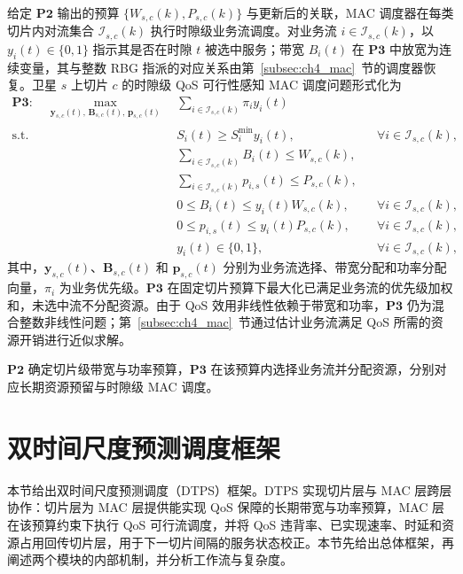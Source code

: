 给定 $\mathbf{P2}$ 输出的预算 $\{W_{s,c}(k),P_{s,c}(k)\}$ 与更新后的关联，MAC 调度器在每类切片内对流集合 $\mathcal I_{s,c}(k)$ 执行时隙级业务流调度。对业务流 $i\in\mathcal I_{s,c}(k)$，以 $y_i(t)\in\{0,1\}$ 指示其是否在时隙 $t$ 被选中服务；带宽 $B_i(t)$ 在 $\mathbf{P3}$ 中放宽为连续变量，其与整数 RBG 指派的对应关系由第~\ref{subsec:ch4_mac}~节的调度器恢复。卫星 $s$ 上切片 $c$ 的时隙级 QoS 可行性感知 MAC 调度问题形式化为
\begin{equation}\label{eq:ch4_P3}
\begin{aligned}
\mathbf{P3:}\quad \max_{\mathbf y_{s,c}(t),\,\mathbf B_{s,c}(t),\,\mathbf p_{s,c}(t)}\ &\sum_{i\in\mathcal I_{s,c}(k)}\pi_i y_i(t)\\
\text{s.t.}\quad &S_i(t)\ge S_i^{\min}y_i(t),&&\forall i\in\mathcal I_{s,c}(k),\\
&\sum_{i\in\mathcal I_{s,c}(k)}B_i(t)\le W_{s,c}(k),&&\\
&\sum_{i\in\mathcal I_{s,c}(k)}p_{i,s}(t)\le P_{s,c}(k),&&\\
&0\le B_i(t)\le y_i(t)W_{s,c}(k),&&\forall i\in\mathcal I_{s,c}(k),\\
&0\le p_{i,s}(t)\le y_i(t)P_{s,c}(k),&&\forall i\in\mathcal I_{s,c}(k),\\
&y_i(t)\in\{0,1\},&&\forall i\in\mathcal I_{s,c}(k),
\end{aligned}
\end{equation}
其中，$\mathbf y_{s,c}(t)$、$\mathbf B_{s,c}(t)$ 和 $\mathbf p_{s,c}(t)$ 分别为业务流选择、带宽分配和功率分配向量，$\pi_i$ 为业务优先级。$\mathbf{P3}$ 在固定切片预算下最大化已满足业务流的优先级加权和，未选中流不分配资源。由于 QoS 效用非线性依赖于带宽和功率，$\mathbf{P3}$ 仍为混合整数非线性问题；第~\ref{subsec:ch4_mac}~节通过估计业务流满足 QoS 所需的资源开销进行近似求解。

$\mathbf{P2}$ 确定切片级带宽与功率预算，$\mathbf{P3}$ 在该预算内选择业务流并分配资源，分别对应长期资源预留与时隙级 MAC 调度。

\section{双时间尺度预测调度框架}
\label{sec:ch4_dtps}

本节给出双时间尺度预测调度（DTPS）框架。DTPS 实现切片层与 MAC 层跨层协作：切片层为 MAC 层提供能实现 QoS 保障的长期带宽与功率预算，MAC 层在该预算约束下执行 QoS 可行流调度，并将 QoS 违背率、已实现速率、时延和资源占用回传切片层，用于下一切片间隔的服务状态校正。本节先给出总体框架，再阐述两个模块的内部机制，并分析工作流与复杂度。

